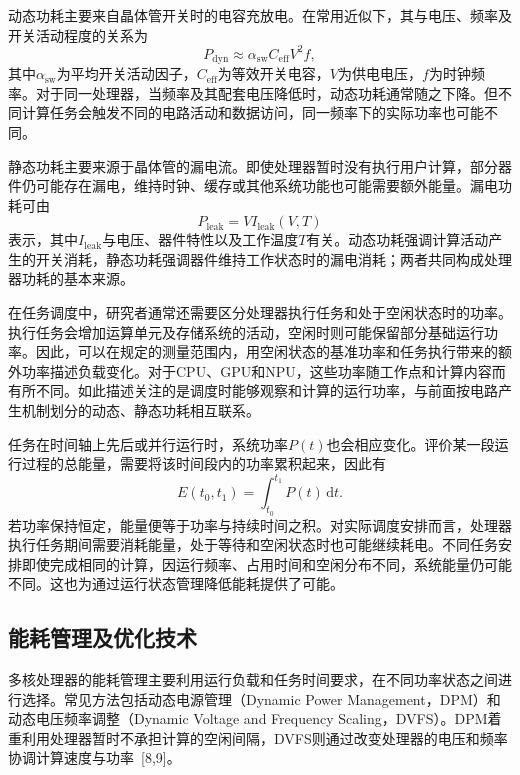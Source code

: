 动态功耗主要来自晶体管开关时的电容充放电。在常用近似下，其与电压、频率及开关活动程度的关系为
\begin{equation}\label{eq:ch2-dynamic}
  P_{\mathrm{dyn}}\approx\alpha_{\mathrm{sw}}C_{\mathrm{eff}}V^2f,
\end{equation}
其中$\alpha_{\mathrm{sw}}$为平均开关活动因子，$C_{\mathrm{eff}}$为等效开关电容，$V$为供电电压，$f$为时钟频率。对于同一处理器，当频率及其配套电压降低时，动态功耗通常随之下降。但不同计算任务会触发不同的电路活动和数据访问，同一频率下的实际功率也可能不同。

静态功耗主要来源于晶体管的漏电流。即使处理器暂时没有执行用户计算，部分器件仍可能存在漏电，维持时钟、缓存或其他系统功能也可能需要额外能量。漏电功耗可由
\begin{equation}\label{eq:ch2-leak}
  P_{\mathrm{leak}}=V I_{\mathrm{leak}}(V,T)
\end{equation}
表示，其中$I_{\mathrm{leak}}$与电压、器件特性以及工作温度$T$有关。动态功耗强调计算活动产生的开关消耗，静态功耗强调器件维持工作状态时的漏电消耗；两者共同构成处理器功耗的基本来源。

在任务调度中，研究者通常还需要区分处理器执行任务和处于空闲状态时的功率。执行任务会增加运算单元及存储系统的活动，空闲时则可能保留部分基础运行功率。因此，可以在规定的测量范围内，用空闲状态的基准功率和任务执行带来的额外功率描述负载变化。对于CPU、GPU和NPU，这些功率随工作点和计算内容而有所不同。如此描述关注的是调度时能够观察和计算的运行功率，与前面按电路产生机制划分的动态、静态功耗相互联系。

任务在时间轴上先后或并行运行时，系统功率$P(t)$也会相应变化。评价某一段运行过程的总能量，需要将该时间段内的功率累积起来，因此有
\begin{equation}\label{eq:ch2-energy}
  E(t_0,t_1)=\int_{t_0}^{t_1}P(t)\,\mathrm{d}t.
\end{equation}
若功率保持恒定，能量便等于功率与持续时间之积。对实际调度安排而言，处理器执行任务期间需要消耗能量，处于等待和空闲状态时也可能继续耗电。不同任务安排即使完成相同的计算，因运行频率、占用时间和空闲分布不同，系统能量仍可能不同。这也为通过运行状态管理降低能耗提供了可能。

\subsection{能耗管理及优化技术}

多核处理器的能耗管理主要利用运行负载和任务时间要求，在不同功率状态之间进行选择。常见方法包括动态电源管理（Dynamic Power Management，DPM）和动态电压频率调整（Dynamic Voltage and Frequency Scaling，DVFS）。DPM着重利用处理器暂时不承担计算的空闲间隔，DVFS则通过改变处理器的电压和频率协调计算速度与功率~[8,9]。

